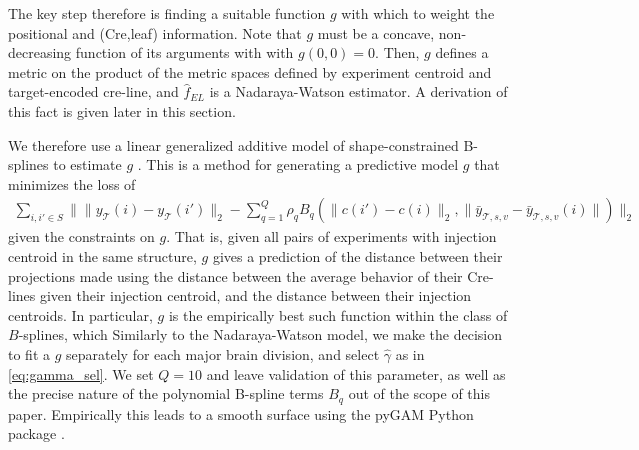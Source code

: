The key step therefore is finding a suitable function $g$ with which to weight the positional and (Cre,leaf) information.
Note that $g$ must be a concave, non-decreasing function of its arguments with with $g(0,0) = 0$.
Then, $g$ defines a metric on the product of the metric spaces defined by experiment centroid and target-encoded cre-line, and $\hat f_{EL}$ is a Nadaraya-Watson estimator. 
A derivation of this fact is given later in this section.

We therefore use a linear generalized additive model of shape-constrained  B-splines to estimate $g$ \citep{Eilers1996-ir}.
This is a method for generating a predictive model $g$ that minimizes the loss of
\begin{eqnarray*}
\sum_{i,i' \in S} \| \|y_{\mathcal T}(i) - y_{\mathcal T}(i')\|_2 - \sum_{q = 1}^Q  \rho_q B_q(\|c(i') - c(i)\|_2,  \| \bar y_{\mathcal T,s,v} -  \bar y_{\mathcal T,s,v}(i)\| )\|_2
\end{eqnarray*}
given the constraints on $g$.
That is, given all pairs of experiments with injection centroid in the same structure, $g$ gives a prediction of the distance between their projections made using the distance between the average behavior of their Cre-lines given their injection centroid, and the distance between their injection centroids.
In particular, $g$ is the empirically best such function within the class of $B$-splines, which 
Similarly to the Nadaraya-Watson model, we make the decision to fit a $g$ separately for each major brain division, and select $\hat \gamma$ as in \ref{eq:gamma_sel}.
We set $Q = 10$ and leave validation of this parameter, as well as the precise nature of the polynomial B-spline terms $B_q$ out of the scope of this paper.
Empirically this leads to a smooth surface using the pyGAM Python package \citep{Serven2018-aa}.

\newpage

